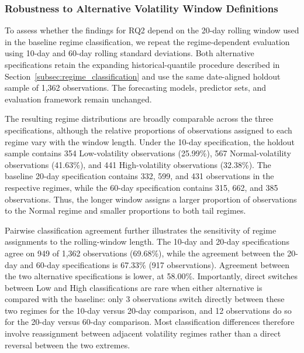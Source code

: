 \documentclass[runningheads,orivec]{llncs}
\begin{document}
\subsubsection{Robustness to Alternative Volatility Window Definitions}\label{subsec:volatility_robustness}

To assess whether the findings for RQ2 depend on the 20-day rolling window used in the baseline regime classification, we repeat the regime-dependent evaluation using 10-day and 60-day rolling standard deviations. Both alternative specifications retain the expanding historical-quantile procedure described in Section~\ref{subsec:regime_classification} and use the same date-aligned holdout sample of 1,362 observations. The forecasting models, predictor sets, and evaluation framework remain unchanged.

The resulting regime distributions are broadly comparable across the three specifications, although the relative proportions of observations assigned to each regime vary with the window length. Under the 10-day specification, the holdout sample contains 354 Low-volatility observations (25.99\%), 567 Normal-volatility observations (41.63\%), and 441 High-volatility observations (32.38\%). The baseline 20-day specification contains 332, 599, and 431 observations in the respective regimes, while the 60-day specification contains 315, 662, and 385 observations. Thus, the longer window assigns a larger proportion of observations to the Normal regime and smaller proportions to both tail regimes.

Pairwise classification agreement further illustrates the sensitivity of regime assignments to the rolling-window length. The 10-day and 20-day specifications agree on 949 of 1,362 observations (69.68\%), while the agreement between the 20-day and 60-day specifications is 67.33\% (917 observations). Agreement between the two alternative specifications is lower, at 58.00\%. Importantly, direct switches between Low and High classifications are rare when either alternative is compared with the baseline: only 3 observations switch directly between these two regimes for the 10-day versus 20-day comparison, and 12 observations do so for the 20-day versus 60-day comparison. Most classification differences therefore involve reassignment between adjacent volatility regimes rather than a direct reversal between the two extremes.
\end{document}
